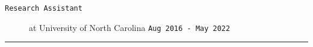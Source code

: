 \documentclass[11pt, letter]{article}
\begin{document}
\begin{minipage}{\textwidth}
\begin{description}
	\item[\tt Research Assistant] at University of North Carolina
	\hfill{\tt Aug 2016 - May 2022}\!

	\vspace{-0.5\baselineskip}
	\end{description}
\hrule
\end{minipage}

\vspace{-0.5\baselineskip}
\end{document}
